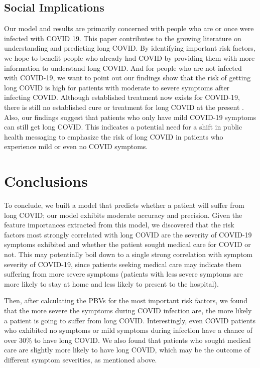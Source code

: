 \documentclass{article}
\begin{document}
\subsection{Social Implications}
Our model and results are primarily concerned with people who are or once were infected with COVID 19. This paper contributes to the growing literature on understanding and predicting long COVID. By identifying important risk factors, we hope to benefit people who already had COVID by providing them with more information to understand long COVID. And for people who are not infected with COVID-19, we want to point out our findings show that the risk of getting long COVID is high for patients with moderate to severe symptoms after infecting COVID. Although established treatment now exists for COVID-19, there is still no established cure or treatment for long COVID at the present \citep{apalongCOVID}. Also, our findings suggest that patients who only have mild COVID-19 symptoms can still get long COVID. This indicates a potential need for a shift in public health messaging to emphasize the risk of long COVID in patients who experience mild or even no COVID symptoms.

\section{Conclusions}
\label{conclusion}
To conclude, we built a model that predicts whether a patient will suffer from long COVID; our model exhibits moderate accuracy and precision. Given the feature importances extracted from this model, we discovered that the risk factors most strongly correlated with long COVID are the severity of COVID-19 symptoms exhibited and whether the patient sought medical care for COVID or not. This may potentially boil down to a single strong correlation with symptom severity of COVID-19, since patients seeking medical care may indicate them suffering from more severe symptoms (patients with less severe symptoms are more likely to stay at home and less likely to present to the hospital).

Then, after calculating the PBVs for the most important risk factors, we found that the more severe the symptoms during COVID infection are, the more likely a patient is going to suffer from long COVID. Interestingly, even COVID patients who exhibited no symptoms or mild symptoms during infection have a chance of over $30\%$ to have long COVID. We also found that patients who sought medical care are slightly more likely to have long COVID, which may be the outcome of different symptom severities, as mentioned above.
\end{document}
